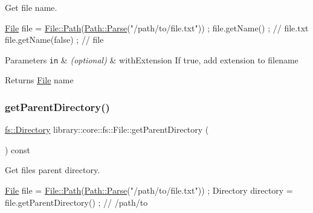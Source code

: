 Get file name. 


\begin{DoxyCode}
\hyperlink{classlibrary_1_1core_1_1fs_1_1File_a7490060f19a21d4ee58bb6cec87a1ca6}{File} file = \hyperlink{classlibrary_1_1core_1_1fs_1_1File_a0e0d8a8becb3cdd21775554e181452d8}{File::Path}(\hyperlink{classlibrary_1_1core_1_1fs_1_1Path_aebf5bd3af83e0b7376616e146f3e55df}{Path::Parse}(\textcolor{stringliteral}{"/path/to/file.txt"})) ;
file.getName() ; \textcolor{comment}{// file.txt}
file.getName(\textcolor{keyword}{false}) ; \textcolor{comment}{// file}
\end{DoxyCode}



\begin{DoxyParams}[1]{Parameters}
\mbox{\tt in}  & {\em (optional)} & with\+Extension If true, add extension to filename \\
\hline
\end{DoxyParams}
\begin{DoxyReturn}{Returns}
\hyperlink{classlibrary_1_1core_1_1fs_1_1File}{File} name 
\end{DoxyReturn}
\mbox{\label{classlibrary_1_1core_1_1fs_1_1File_a8eb74097f9bdc9d3c626fe4924bf405e}} 
\subsubsection{\texorpdfstring{get\+Parent\+Directory()}{getParentDirectory()}}
{\footnotesize\ttfamily \hyperlink{classlibrary_1_1core_1_1fs_1_1Directory}{fs\+::\+Directory} library\+::core\+::fs\+::\+File\+::get\+Parent\+Directory (\begin{DoxyParamCaption}{ }\end{DoxyParamCaption}) const}



Get file\textquotesingle{}s parent directory. 


\begin{DoxyCode}
\hyperlink{classlibrary_1_1core_1_1fs_1_1File_a7490060f19a21d4ee58bb6cec87a1ca6}{File} file = \hyperlink{classlibrary_1_1core_1_1fs_1_1File_a0e0d8a8becb3cdd21775554e181452d8}{File::Path}(\hyperlink{classlibrary_1_1core_1_1fs_1_1Path_aebf5bd3af83e0b7376616e146f3e55df}{Path::Parse}(\textcolor{stringliteral}{"/path/to/file.txt"})) ;
Directory directory = file.getParentDirectory() ; \textcolor{comment}{// /path/to}
\end{DoxyCode}


